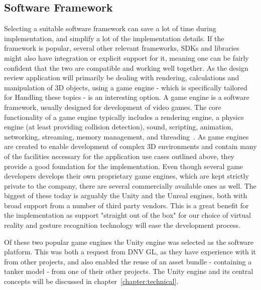 \subsection{Software Framework}
Selecting a suitable software framework can save a lot of time during implementation, and simplify a lot of the implementation details. 
If the framework is popular, several other relevant frameworks, SDKs and libraries might also have integration or explicit support for it, 
meaning one can be fairly confident that the two are compatible and working well together. 
As the design review application will primarily be dealing with rendering, calculations and manipulation of 3D objects, using a game engine - which is specifically tailored for Handling
these topics - is an interesting option.
A game engine is a software framework, usually designed for development of video games. 
The core functionality of a game engine typically includes a rendering engine, a physics engine (at least providing collision detection), sound, scripting, 
animation, networking, streaming, memory management, and threading~\citep{Gregory2014}. As game engines are created to enable development of complex 
3D environments and contain many of the facilities necessary for the application use cases outlined above, they provide a good foundation for the implementation.
Even though several game developers develops their own proprietary game engines, which are kept strictly private to the company, there are several commercially available ones 
as well. The biggest of these today is arguably the Unity and the Unreal engines, both with broad support from a number of third party vendors. 
This is a great benefit for the implementation 
as support "straight out of the box" for our choice of virtual reality and gesture recognition technology will ease the development process.

Of these two popular game engines the Unity engine was selected as the software platform. This was both a request from DNV GL, 
as they have experience with it from other projects, and also enabled the reuse of an asset bundle - containing a tanker model - from one of their other projects.
The Unity engine and its central concepts will be discussed in chapter~\vref{chapter:technical}.

